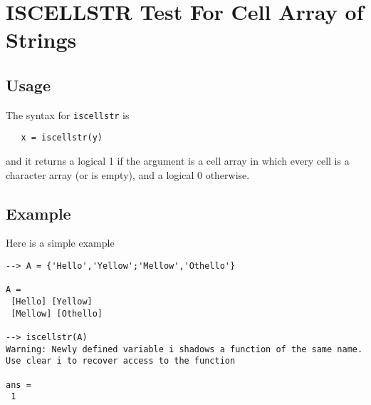\section{ISCELLSTR Test For Cell Array of Strings}

\subsection{Usage}

The syntax for \verb|iscellstr| is 
\begin{verbatim}
   x = iscellstr(y)
\end{verbatim}
and it returns a logical 1 if the argument is a cell array
in which every cell is a character array (or is empty), and
a logical 0 otherwise.
\subsection{Example}

Here is a simple example
\begin{verbatim}
--> A = {'Hello','Yellow';'Mellow','Othello'}

A = 
 [Hello] [Yellow] 
 [Mellow] [Othello] 

--> iscellstr(A)
Warning: Newly defined variable i shadows a function of the same name.  Use clear i to recover access to the function

ans = 
 1 
\end{verbatim}
